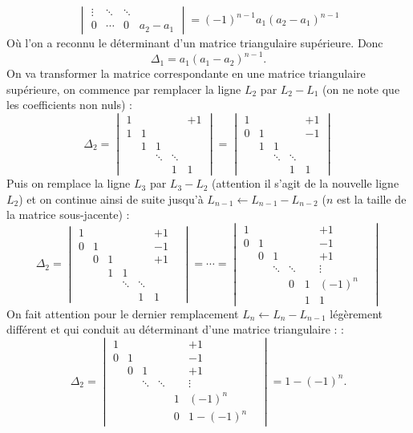 {{$$\begin{vmatrix}
     \vdots &\ddots&\ddots&    \\
     0&\cdots&0   & a_2-a_1
   \end{vmatrix}
= (-1)^{n-1}a_1(a_2-a_1)^{n-1}
$$
Où l'on a reconnu le déterminant d'un matrice triangulaire supérieure.
Donc 
$$\Delta_1 = a_1(a_1-a_2)^{n-1}.$$
On va transformer la matrice correspondante en une matrice triangulaire supérieure,
on commence par remplacer la ligne $L_2$ par $L_2-L_1$ (on ne note que les coefficients non nuls) : 
$$\Delta_2 =   \begin{vmatrix}
  1 &      &    &   &+1 \\
  1 &1      && &  \\
   &1      &1  & &\\
   & &\ddots &\ddots & \\
  &  &       &1      &1
\end{vmatrix}=
 \begin{vmatrix}
  1 &      &    &   &+1 \\
  0 &1      && &  -1\\
   &1      &1  & &\\
   & &\ddots &\ddots & \\
  &  &       &1      &1
\end{vmatrix}
$$
Puis on remplace la ligne $L_3$ par $L_3-L_2$ (attention il s'agit de la nouvelle ligne $L_2$) et on 
continue ainsi de suite jusqu'à $L_{n-1} \leftarrow L_{n-1}-L_{n-2}$ ($n$ est la taille de la matrice sous-jacente) :
$$\Delta_2 =   \begin{vmatrix}
  1 &      &    &   &&+1 \\
  0 &1      && &  &-1\\
    & 0      &1  & & &+1\\
    & & 1      &1  & && \\
   & &&\ddots &\ddots & \\
  &  &       &&1      &1                 
               \end{vmatrix}
= \cdots = 
\begin{vmatrix}
  1 &      &    &   &&+1 \\
  0 &1      && &  &-1\\
    & 0      &1  & & &+1\\
    & & \ddots      &\ddots  & &\vdots& \\
   & &&0 &1 & (-1)^{n} \\
  &  &       &&1      &1                 
               \end{vmatrix}
$$
On fait attention pour le dernier remplacement $L_n \leftarrow L_n-L_{n-1}$ légèrement différent et qui conduit au déterminant d'une matrice triangulaire : :
$$\Delta_2 = \begin{vmatrix}
  1 &      &    &   &&+1 \\
  0 &1      && &  &-1\\
    & 0      &1  & & &+1\\
    & & \ddots      &\ddots  & &\vdots& \\
   & && &1 & (-1)^{n}\\
  &  &       &&0      &1 - (-1)^{n}                 
               \end{vmatrix}
= 1 - (-1)^{n}.
$$

}}
